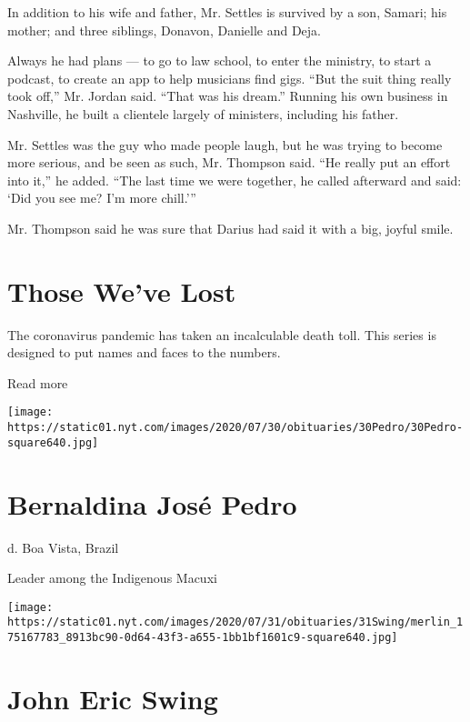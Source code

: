 In addition to his wife and father, Mr. Settles is survived by a son,
Samari; his mother; and three siblings, Donavon, Danielle and Deja.

Always he had plans --- to go to law school, to enter the ministry, to
start a podcast, to create an app to help musicians find gigs. ``But the
suit thing really took off,'' Mr. Jordan said. ``That was his dream.''
Running his own business in Nashville, he built a clientele largely of
ministers, including his father.

Mr. Settles was the guy who made people laugh, but he was trying to
become more serious, and be seen as such, Mr. Thompson said. ``He really
put an effort into it,'' he added. ``The last time we were together, he
called afterward and said: `Did you see me? I'm more chill.'''

Mr. Thompson said he was sure that Darius had said it with a big, joyful
smile.

\href{https://www.nytimes.com/interactive/2020/obituaries/people-died-coronavirus-obituaries.html?action=click\&pgtype=Article\&state=default\&region=BELOW_MAIN_CONTENT\&context=covid_obits_promo}{}

\hypertarget{those-weve-lost}{%
\section{Those We've Lost}\label{those-weve-lost}}

The coronavirus pandemic has taken an incalculable death toll. This
series is designed to put names and faces to the numbers.

Read more

\texttt{[image: https://static01.nyt.com/images/2020/07/30/obituaries/30Pedro/30Pedro-square640.jpg]}

\hypertarget{bernaldina-josuxe9-pedro}{%
\section{Bernaldina José Pedro}\label{bernaldina-josuxe9-pedro}}

d. Boa Vista, Brazil

Leader among the Indigenous Macuxi

\texttt{[image: https://static01.nyt.com/images/2020/07/31/obituaries/31Swing/merlin\_175167783\_8913bc90-0d64-43f3-a655-1bb1bf1601c9-square640.jpg]}

\hypertarget{john-eric-swing}{%
\section{John Eric Swing}\label{john-eric-swing}}

